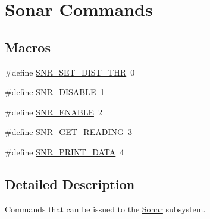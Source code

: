 \hypertarget{group__sonar__commands}{\section{Sonar Commands}
\label{group__sonar__commands}
}
\subsection*{Macros}
\begin{DoxyCompactItemize}
\item 
\#define \hyperlink{group__sonar__commands_gaa5d2a4af7281457c965323f4c26ea9ab}{S\-N\-R\-\_\-\-S\-E\-T\-\_\-\-D\-I\-S\-T\-\_\-\-T\-H\-R}~0
\item 
\#define \hyperlink{group__sonar__commands_ga9b110968cd5bd961f4984c02965cf9ba}{S\-N\-R\-\_\-\-D\-I\-S\-A\-B\-L\-E}~1
\item 
\#define \hyperlink{group__sonar__commands_ga994c94413393c44561f42e781da5815f}{S\-N\-R\-\_\-\-E\-N\-A\-B\-L\-E}~2
\item 
\#define \hyperlink{group__sonar__commands_ga6b4b3d5c4969ca317548a1d9c8686c4f}{S\-N\-R\-\_\-\-G\-E\-T\-\_\-\-R\-E\-A\-D\-I\-N\-G}~3
\item 
\#define \hyperlink{group__sonar__commands_ga6be2722dee0ec3582372f8170b3c127b}{S\-N\-R\-\_\-\-P\-R\-I\-N\-T\-\_\-\-D\-A\-T\-A}~4
\end{DoxyCompactItemize}


\subsection{Detailed Description}
Commands that can be issued to the \hyperlink{classSonar}{Sonar} subsystem. 

